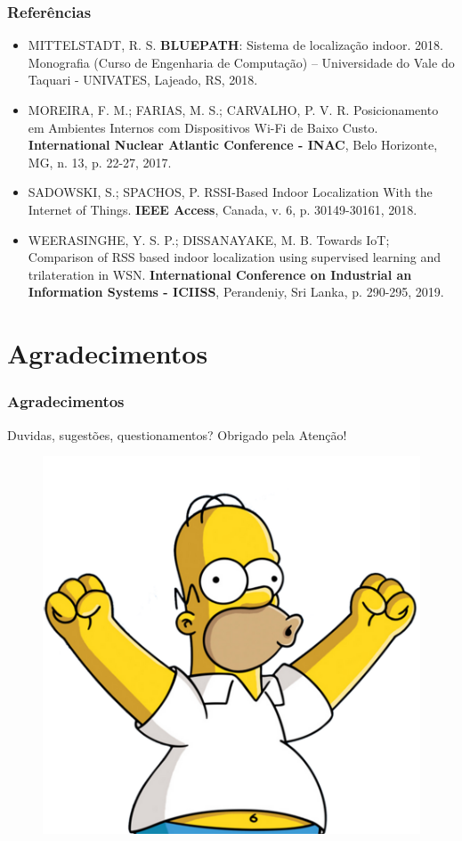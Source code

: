 \documentclass[xcolor={dvipsnames,svgnames,table}]{beamer}
\begin{document}
	\begin{frame}
		\frametitle{Referências}
		\begin{itemize}[left=0pt]%
			\setlength\itemsep{5pt}
			\justifying
			
			\item {\footnotesize MITTELSTADT, R. S. \textbf{BLUEPATH}: Sistema de localização indoor. 2018. Monografia (Curso de Engenharia de Computação) – Universidade do Vale do Taquari - UNIVATES, Lajeado, RS, 2018.}
			
			\item {\footnotesize MOREIRA, F. M.; FARIAS, M. S.; CARVALHO, P. V. R. Posicionamento em Ambientes Internos com Dispositivos Wi-Fi de Baixo Custo. \textbf{International Nuclear Atlantic Conference - INAC}, Belo Horizonte, MG, n. 13, p. 22-27, 2017.}
			
			\item {\footnotesize SADOWSKI, S.; SPACHOS, P. RSSI-Based Indoor Localization With the Internet of Things. \textbf{IEEE Access}, Canada, v. 6, p. 30149-30161, 2018.}
			
			\item {\footnotesize WEERASINGHE, Y. S. P.; DISSANAYAKE, M. B. Towards IoT; Comparison of RSS based indoor localization using supervised learning and trilateration in WSN. \textbf{International Conference on Industrial an Information Systems - ICIISS}, Perandeniy, Sri Lanka, p. 290-295, 2019.}
			
		\end{itemize}
	\end{frame}

	\section{Agradecimentos}
	\label{agradecimentos}
	\begin{frame}
		\frametitle{Agradecimentos}
		\begin{block}{Duvidas, sugestões, questionamentos?}
			\centering
			{\Large Obrigado pela Atenção!}
		\end{block}
		\vspace{-20pt}
		\begin{figure}
			\centering
			\includegraphics[width=0.55\linewidth]{imgs/homer.png}
		\end{figure}
	\end{frame}
		
\end{document}
